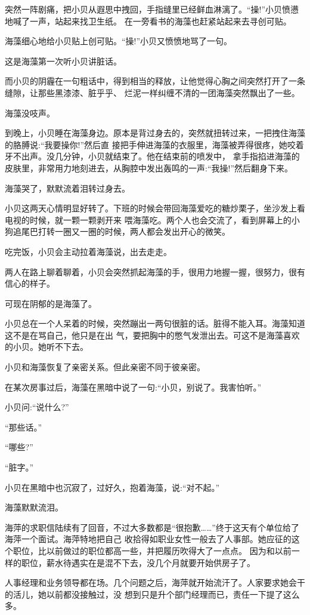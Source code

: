 \documentclass[11pt,a4paper,onecolumn]{article}
\begin{document}
突然一阵剧痛，把小贝从遐思中拽回，手指缝里已经鲜血淋漓了。``操!''小贝愤懑地喊了一声，站起来找卫生纸。
在一旁看书的海藻也赶紧站起来去寻创可贴。

海藻细心地给小贝贴上创可贴。``操!''小贝又愤愤地骂了一句。

这是海藻第一次听小贝讲脏话。

而小贝的阴霾在一句粗话中，得到相当的释放，让他觉得心胸之间突然打开了一条缝隙，让那些黑漆漆、脏乎乎、
烂泥一样纠缠不清的一团海藻突然飘出了一些。

海藻没吱声。

到晚上，小贝睡在海藻身边。原本是背过身去的，突然就扭转过来，一把拽住海藻的胳膊说:``我要操你!''然后直
接把手伸进海藻的衣服里，海藻被弄得很疼，她咬着牙不出声。没几分钟，小贝就结束了。他在结束前的喷发中，
拿手指掐进海藻的皮肤里，非常用力地刻进去，从胸腔中发出轰鸣的一声:``我操!''然后翻身下来。

海藻哭了，默默流着泪转过身去。

小贝这两天心情明显好转了。下班的时候会带回海藻爱吃的糖炒栗子，坐沙发上看电视的时候，就一颗一颗剥开来
喂海藻吃。两个人也会交流了，看到屏幕上的小狗追尾巴打转一圈又一圈的时候，两人都会发出开心的微笑。

吃完饭，小贝会主动拉着海藻说，出去走走。

两人在路上聊着聊着，小贝会突然抓起海藻的手，很用力地握一握，很努力，很有信心的样子。

可现在阴郁的是海藻了。

小贝总在一个人呆着的时候，突然蹦出一两句很脏的话。脏得不能入耳。海藻知道这不是在骂自己，他只是在出
气，要把胸中的憋气发泄出去。可这不是海藻喜欢的小贝。她听不下去。

小贝和海藻恢复了亲密关系。但此亲密不同于彼亲密。

在某次房事过后，海藻在黑暗中说了一句:``小贝，别说了。我害怕听。''

小贝问:``说什么?''

``那些话。''

``哪些?''

``脏字。''

小贝在黑暗中也沉寂了，过好久，抱着海藻，说:``对不起。''

海藻默默流泪。

海萍的求职信陆续有了回音，不过大多数都是``很抱歉……''终于这天有个单位给了海萍一个面试。海萍特地把自己
收拾得如职业女性一般去了人事部。她应征的这个职位，比以前做过的职位都高一些，并把履历吹得大了一点点。
因为和以前一样的职位，薪水待遇实在是混不下去，没几个月就要开始供房子了。

人事经理和业务领导都在场。几个问题之后，海萍就开始流汗了。人家要求她会干的活儿，她以前都没接触过，没
想到只是升个部门经理而已，责任一下提了这么多。
\end{document}
